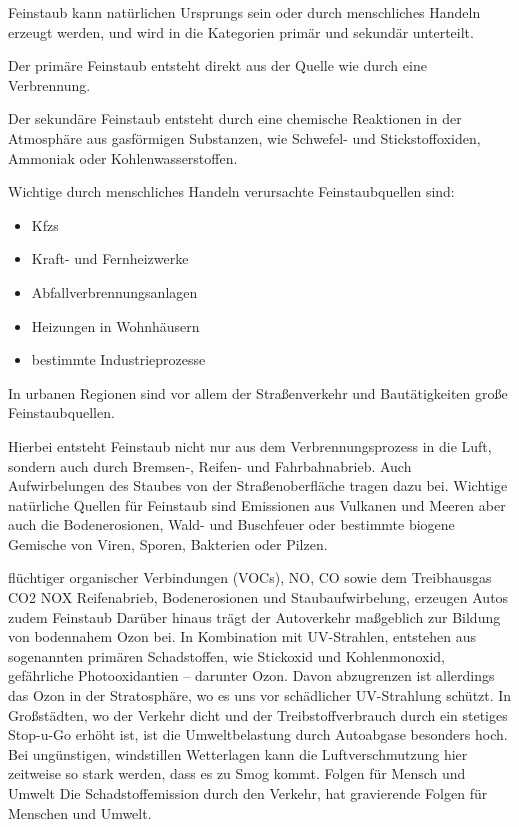Feinstaub kann natürlichen Ursprungs sein oder durch menschliches Handeln erzeugt werden,
und wird in die Kategorien primär und sekundär unterteilt.

Der primäre Feinstaub entsteht direkt aus der Quelle wie durch eine Verbrennung.  

Der sekundäre Feinstaub entsteht durch eine chemische Reaktionen in der Atmosphäre aus gasförmigen Substanzen, wie Schwefel- und Stickstoffoxiden, Ammoniak oder Kohlenwasserstoffen.

Wichtige durch menschliches Handeln verursachte Feinstaubquellen sind: 
\begin{itemize}
	\item \acfp{Kfz}
	\item Kraft- und Fernheizwerke
	\item Abfallverbrennungsanlagen
	\item Heizungen in Wohnhäusern
	\item bestimmte Industrieprozesse
\end{itemize}

In urbanen Regionen sind vor allem der Straßenverkehr und Bautätigkeiten große Feinstaubquellen.

Hierbei entsteht Feinstaub nicht nur aus dem Verbrennungsprozess in die Luft, sondern auch durch Bremsen-, Reifen- und Fahrbahnabrieb. 
Auch Aufwirbelungen des Staubes von der Straßenoberfläche tragen dazu bei. 
Wichtige natürliche Quellen für Feinstaub sind Emissionen aus Vulkanen und Meeren aber auch die Bodenerosionen, Wald- und Buschfeuer oder bestimmte biogene Gemische von Viren, Sporen, Bakterien oder Pilzen.








flüchtiger organischer Verbindungen (VOCs), \ac{NO}, \ac{CO} sowie dem Treibhausgas \ac{CO2} \ac{NOX}
Reifenabrieb, Bodenerosionen und Staubaufwirbelung, erzeugen Autos zudem Feinstaub
Darüber hinaus trägt der Autoverkehr maßgeblich zur Bildung von bodennahem Ozon bei. 
In Kombination mit UV-Strahlen, entstehen aus sogenannten primären Schadstoffen, wie Stickoxid und Kohlenmonoxid, gefährliche Photooxidantien – darunter Ozon. 
Davon abzugrenzen ist allerdings das Ozon in der Stratosphäre, wo es uns vor schädlicher UV-Strahlung schützt.
In Großstädten, wo der Verkehr dicht und der Treibstoffverbrauch durch ein stetiges Stop-u-Go erhöht ist, ist die Umweltbelastung durch Autoabgase besonders hoch. 
Bei ungünstigen, windstillen Wetterlagen kann die Luftverschmutzung hier zeitweise so stark werden, dass es zu Smog kommt.
Folgen für Mensch und Umwelt
Die Schadstoffemission durch den Verkehr, hat gravierende Folgen für Menschen und Umwelt.

